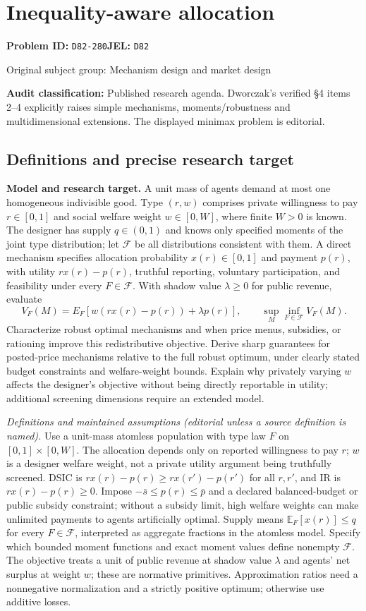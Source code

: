 \documentclass[11pt,a4paper]{article}
\begin{document}
\section*{Inequality-aware allocation}
\textbf{Problem ID:} \texttt{D82-280}\quad \textbf{JEL:} \texttt{D82}\par
\label{problem:OP-0296}
{\sffamily\small\color{muted}Original subject group: Mechanism design and market design\par}
\label{definitions:problem:30007578}
\textbf{Audit classification:} Published research agenda. Dworczak’s verified §4 items 2–4 explicitly raises simple mechanisms, moments/robustness and multidimensional extensions. The displayed minimax problem is editorial.
\subsection*{Definitions and precise research target}
\textbf{Model and research target.} A unit mass of agents demand at most one homogeneous indivisible good. Type \((r,w)\) comprises private willingness to pay \(r\in[0,1]\) and social welfare weight \(w\in[0,W]\), where finite \(W>0\) is known. The designer has supply \(q\in(0,1)\) and knows only specified moments of the joint type distribution; let \(\mathcal F\) be all distributions consistent with them. A direct mechanism specifies allocation probability \(x(r)\in[0,1]\) and payment \(p(r)\), with utility \(r x(r)-p(r)\), truthful reporting, voluntary participation, and feasibility under every \(F\in\mathcal F\). With shadow value \(\lambda\geq0\) for public revenue, evaluate
\[
 V_F(M)=E_F[w(r x(r)-p(r))+\lambda p(r)],\qquad
 \sup_M\inf_{F\in\mathcal F}V_F(M).
\]
Characterize robust optimal mechanisms and when price menus, subsidies, or rationing improve this redistributive objective. Derive sharp guarantees for posted-price mechanisms relative to the full robust optimum, under clearly stated budget constraints and welfare-weight bounds. Explain why privately varying \(w\) affects the designer's objective without being directly reportable in utility; additional screening dimensions require an extended model.

\emph{Definitions and maintained assumptions (editorial unless a source definition is named).} Use a unit-mass atomless population with type law \(F\) on \([0,1]\times[0,W]\). The allocation depends only on reported willingness to pay \(r\); \(w\) is a designer welfare weight, not a private utility argument being truthfully screened. DSIC is \(rx(r)-p(r)\ge rx(r')-p(r')\) for all \(r,r'\), and IR is \(rx(r)-p(r)\ge0\). Impose \(-\bar s\le p(r)\le\bar p\) and a declared balanced-budget or public subsidy constraint; without a subsidy limit, high welfare weights can make unlimited payments to agents artificially optimal. Supply means \(\mathbb E_F[x(r)]\le q\) for every \(F\in\mathcal F\), interpreted as aggregate fractions in the atomless model. Specify which bounded moment functions and exact moment values define nonempty \(\mathcal F\). The objective treats a unit of public revenue at shadow value \(\lambda\) and agents’ net surplus at weight \(w\); these are normative primitives. Approximation ratios need a nonnegative normalization and a strictly positive optimum; otherwise use additive losses.
\end{document}
